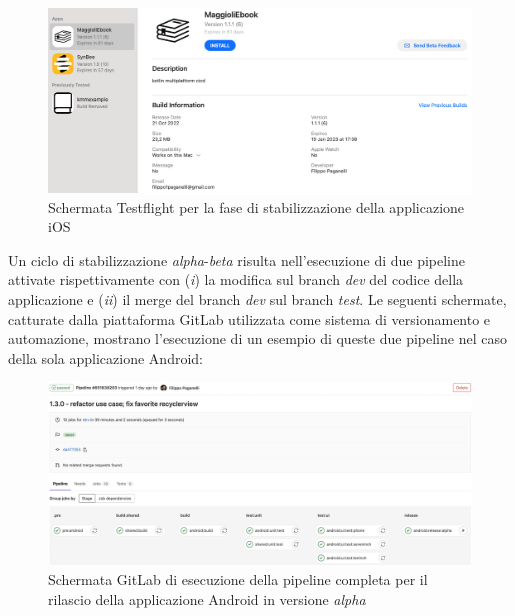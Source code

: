 \begin{figure}[H]
    \centering
    \includegraphics[width=1\textwidth]{img/testflight-maggioliebook.png}
    \caption{Schermata Testflight per la fase di stabilizzazione della applicazione iOS}
    \label{testflight-maggioliebook}
\end{figure}

Un ciclo di stabilizzazione \textit{alpha}-\textit{beta} risulta nell'esecuzione di due pipeline attivate rispettivamente con (\textit{i}) la modifica sul branch \textit{dev} del codice della applicazione e (\textit{ii}) il merge del branch \textit{dev} sul branch \textit{test}. Le seguenti schermate, catturate dalla piattaforma GitLab utilizzata come sistema di versionamento e automazione, mostrano l'esecuzione di un esempio di queste due pipeline nel caso della sola applicazione Android:

\begin{figure}[H]
\centering
    \includegraphics[width=1\textwidth]{img/gitlab-pipeline-android-alpha.png}
    \caption{Schermata GitLab di esecuzione della pipeline completa per il rilascio della applicazione Android in versione \textit{alpha}}
    \label{gitlab-pipeline-android-alpha}
\end{figure}

